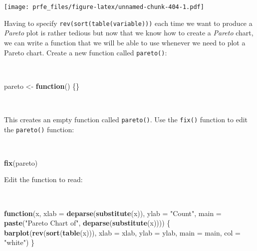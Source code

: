 \documentclass[12pt,a4paper]{book}
\newenvironment{Shaded}{\begin{snugshade}}{\end{snugshade}}
\newcommand{\KeywordTok}[1]{\textcolor[rgb]{0.13,0.29,0.53}{\textbf{#1}}}
\newcommand{\DataTypeTok}[1]{\textcolor[rgb]{0.13,0.29,0.53}{#1}}
\newcommand{\StringTok}[1]{\textcolor[rgb]{0.31,0.60,0.02}{#1}}
\newcommand{\ControlFlowTok}[1]{\textcolor[rgb]{0.13,0.29,0.53}{\textbf{#1}}}
\newcommand{\NormalTok}[1]{#1}
\theoremstyle{definition}
\theoremstyle{definition}
\theoremstyle{definition}
\theoremstyle{remark}
\begin{document}
\texttt{[image: prfe\_files/figure-latex/unnamed-chunk-404-1.pdf]}

\newpage

Having to specify \texttt{rev(sort(table(variable)))} each time we want
to produce a \emph{Pareto} plot is rather tedious but now that we know
how to create a \emph{Pareto} chart, we can write a function that we
will be able to use whenever we need to plot a Pareto chart. Create a
new function called \texttt{pareto()}:

~

\begin{Shaded}
\begin{Highlighting}[]
\NormalTok{pareto <-}\StringTok{ }\ControlFlowTok{function}\NormalTok{() \{\}}
\end{Highlighting}
\end{Shaded}

~

This creates an empty function called \texttt{pareto()}. Use the
\texttt{fix()} function to edit the \texttt{pareto()} function:

~

\begin{Shaded}
\begin{Highlighting}[]
\KeywordTok{fix}\NormalTok{(pareto)}
\end{Highlighting}
\end{Shaded}

Edit the function to read:

~

\begin{Shaded}
\begin{Highlighting}[]
\ControlFlowTok{function}\NormalTok{(x,}
         \DataTypeTok{xlab =} \KeywordTok{deparse}\NormalTok{(}\KeywordTok{substitute}\NormalTok{(x)),}
         \DataTypeTok{ylab =} \StringTok{"Count"}\NormalTok{,}
         \DataTypeTok{main =} \KeywordTok{paste}\NormalTok{(}\StringTok{"Pareto Chart of"}\NormalTok{, }\KeywordTok{deparse}\NormalTok{(}\KeywordTok{substitute}\NormalTok{(x)))) \{}
  \KeywordTok{barplot}\NormalTok{(}\KeywordTok{rev}\NormalTok{(}\KeywordTok{sort}\NormalTok{(}\KeywordTok{table}\NormalTok{(x))),}
          \DataTypeTok{xlab =}\NormalTok{ xlab,}
          \DataTypeTok{ylab =}\NormalTok{ ylab,}
          \DataTypeTok{main =}\NormalTok{ main,}
          \DataTypeTok{col =} \StringTok{"white"}\NormalTok{)}
\NormalTok{\}}
\end{Highlighting}
\end{Shaded}
\end{document}
